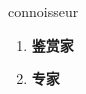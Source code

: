 
\begin{frame}
{\huge connoisseur}
\begin{center}
\begin{enumerate}\Large
  \item \textbf{鉴赏家}
  \item \textbf{专家}
\end{enumerate}
\end{center}
\end{frame}
